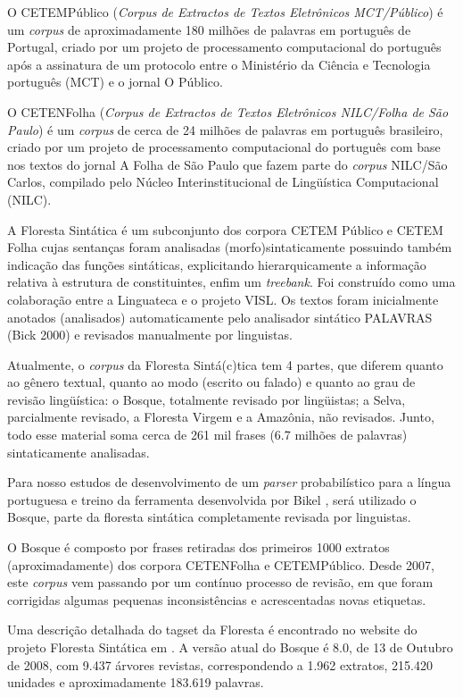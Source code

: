 O CETEMPúblico (\emph{Corpus de Extractos de Textos Eletrônicos MCT/Público}) é um \emph{corpus} de aproximadamente 180 milhões de palavras em português de Portugal, criado por um projeto de processamento computacional do português após a assinatura de um protocolo entre o Ministério da Ciência e Tecnologia português (MCT) e o jornal O Público.

O CETENFolha (\emph{Corpus de Extractos de Textos Eletrônicos NILC/Folha de São Paulo}) é um \emph{corpus} de cerca de 24 milhões de palavras em português brasileiro, criado por um projeto de processamento computacional do português com base nos textos do jornal A Folha de São Paulo que fazem parte do \emph{corpus} NILC/São Carlos, compilado pelo Núcleo Interinstitucional de Lingüística Computacional (NILC).

A Floresta Sintática é um subconjunto dos corpora CETEM Público e CETEM Folha cujas sentanças foram analisadas (morfo)sintaticamente possuindo também indicação das funções sintáticas, explicitando hierarquicamente a informação relativa à estrutura de constituintes, enfim um \emph{treebank}. Foi construído como uma colaboração entre a Linguateca e o projeto VISL. Os textos foram inicialmente anotados (analisados) automaticamente pelo analisador sintático PALAVRAS (Bick 2000) e revisados manualmente por linguistas.

Atualmente, o \emph{corpus} da Floresta Sintá(c)tica tem 4 partes, que diferem quanto ao gênero textual, quanto ao modo (escrito ou falado) e quanto ao grau de revisão lingüística: o Bosque, totalmente revisado por lingüistas; a Selva, parcialmente revisado, a Floresta Virgem e a Amazônia, não revisados. Junto, todo esse material soma cerca de 261 mil frases (6.7 milhões de palavras) sintaticamente analisadas.

Para nosso estudos de desenvolvimento de um \emph{parser} probabilístico para a língua portuguesa e treino da ferramenta desenvolvida por Bikel , será utilizado o Bosque, parte da floresta sintática completamente revisada por linguistas.

O Bosque é composto por frases retiradas dos primeiros 1000 extratos (aproximadamente) dos corpora CETENFolha e CETEMPúblico. Desde 2007, este \emph{corpus} vem passando por um contínuo processo de revisão, em que foram corrigidas algumas pequenas inconsistências e acrescentadas novas etiquetas.

Uma descrição detalhada do tagset da Floresta é encontrado no website do projeto Floresta Sintática em \cite{bosque}. A versão atual do Bosque é 8.0, de 13 de Outubro de 2008, com 9.437 árvores revistas, correspondendo a 1.962 extratos, 215.420 unidades e aproximadamente 183.619 palavras.


